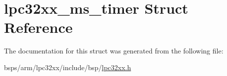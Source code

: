 \hypertarget{structlpc32xx__ms__timer}{}\section{lpc32xx\+\_\+ms\+\_\+timer Struct Reference}
\label{structlpc32xx__ms__timer}


The documentation for this struct was generated from the following file\+:\begin{DoxyCompactItemize}
\item 
bsps/arm/lpc32xx/include/bsp/\mbox{\hyperlink{lpc32xx_8h}{lpc32xx.\+h}}\end{DoxyCompactItemize}
